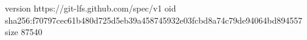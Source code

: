 version https://git-lfs.github.com/spec/v1
oid sha256:f70797cec61b480d725d5eb39a458745932e03fcbd8a74c79de94064bd894557
size 87540
